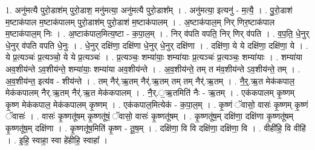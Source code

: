 \documentclass[17pt]{extarticle}
\begin{document}
1. अनु॑मत्यै पुरो॒डाश॑म् पुरो॒डाश॒ मनु॑मत्या॒ अनु॑मत्यै 
पुरो॒डाश᳚म् । . अनु॑मत्या॒ इत्यनु॑ - म॒त्यै॒ । . पु॒रो॒डाश॑ म॒ष्टाक॑पाल म॒ष्टाक॑पालम् पुरो॒डाश॑म् पुरो॒डाश॑ म॒ष्टाक॑पालम् । . अ॒ष्टाक॑पाल॒म् निर् णिर॒ष्टाक॑पाल म॒ष्टाक॑पाल॒म् निः । . अ॒ष्टाक॑पाल॒मित्य॒ष्टा - क॒पा॒ल॒म् । . निर् व॑पति वपति॒ निर् णिर् व॑पति । . व॒प॒ति॒ धे॒नुर् धे॒नुर् व॑पति वपति धे॒नुः । . धे॒नुर् दक्षि॑णा॒ दक्षि॑णा धे॒नुर् धे॒नुर् दक्षि॑णा । . दक्षि॑णा॒ ये ये दक्षि॑णा॒ दक्षि॑णा॒ ये । . ये प्र॒त्यञ्चः॑ प्र॒त्यञ्चो॒ ये ये प्र॒त्यञ्चः॑ । . प्र॒त्यञ्चः॒ शम्या॑याः॒ शम्या॑याः प्र॒त्यञ्चः॑ प्र॒त्यञ्चः॒ शम्या॑याः । . शम्या॑या अव॒शीय॑न्ते ऽव॒शीय॑न्ते॒ शम्या॑याः॒ शम्या॑या 
अव॒शीय॑न्ते । . अ॒व॒शीय॑न्ते॒ तम् त म॑व॒शीय॑न्ते ऽव॒शीय॑न्ते॒ तम् । . अ॒व॒शीय॑न्त॒ इत्य॑व - शीय॑न्ते । . तम् नैर्॑.ऋ॒तम् नैर्॑.ऋ॒तम् तम् तम् नैर्॑.ऋ॒तम् । . नै॒र्॒.ऋ॒त मेक॑कपाल॒ मेक॑कपालम् नैर्.ऋ॒तम् नैर्॑.ऋ॒त मेक॑कपालम् । . नै॒र्.॒ऋ॒तमिति॑ नैः - ऋ॒तम् । . एक॑कपालम् कृ॒ष्णम् कृ॒ष्ण मेक॑कपाल॒ मेक॑कपालम् कृ॒ष्णम् । . एक॑कपाल॒मित्येक॑ - क॒पा॒ल॒म् । . कृ॒ष्णं ॅवासो॒ वासः॑ कृ॒ष्णम् कृ॒ष्णं ॅवासः॑ । . वासः॑ कृ॒ष्णतू॑षम् कृ॒ष्णतू॑षं॒ ॅवासो॒ वासः॑ कृ॒ष्णतू॑षम् । . कृ॒ष्णतू॑ष॒म् दक्षि॑णा॒ दक्षि॑णा कृ॒ष्णतू॑षम् कृ॒ष्णतू॑ष॒म् दक्षि॑णा । . कृ॒ष्णतू॑ष॒मिति॑ कृ॒ष्ण - तू॒ष॒म् । . दक्षि॑णा॒ वि वि दक्षि॑णा॒ दक्षि॑णा॒ वि । . वीही॑हि॒ वि वीहि॑ । . इ॒हि॒ स्वाहा॒ स्वा हे॑हीहि॒ स्वाहा᳚ । \newline
\end{document}
